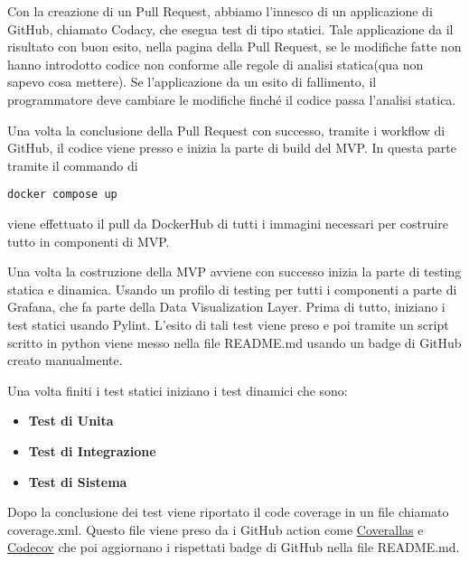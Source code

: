 Con la creazione di un Pull Request, abbiamo l'innesco di un applicazione di GitHub, chiamato Codacy, che esegua test di tipo statici. Tale applicazione da il risultato con buon esito, nella pagina della Pull Request, se le modifiche fatte non hanno introdotto codice non conforme alle regole di analisi statica(qua non sapevo cosa mettere). Se l'applicazione da un esito di fallimento, il programmatore deve cambiare le modifiche finché il codice passa l'analisi statica.

\vspace{0.2cm}

Una volta la conclusione della Pull Request con successo, tramite i workflow di GitHub, il codice viene presso e inizia la parte di build del MVP. In questa parte tramite il commando di
\begin{lstlisting}[style=code]
    docker compose up
\end{lstlisting}
viene effettuato il pull da DockerHub di tutti i immagini necessari per costruire tutto in componenti di MVP.

\vspace{0.2cm}

Una volta la costruzione della MVP avviene con successo inizia la parte di testing statica e dinamica. Usando un profilo di testing per tutti i componenti a parte di Grafana, che fa parte della Data Visualization Layer. Prima di tutto, iniziano i test statici usando Pylint. L'esito di tali test viene preso e poi tramite un script scritto in python viene messo nella file README.md usando un badge di GitHub creato manualmente.

\vspace{0.2cm}

Una volta finiti i test statici iniziano i test dinamici che sono:

\begin{itemize}
    \item \textbf{Test di Unita}
    \item \textbf{Test di Integrazione}
    \item \textbf{Test di Sistema}
\end{itemize}

Dopo la conclusione dei test viene riportato il code coverage in un file chiamato coverage.xml. Questo file viene preso da i GitHub action come \href{https://github.com/marketplace/actions/coveralls-github-action}{Coverallas} e \href{https://github.com/marketplace/actions/codecov}{Codecov}
che poi aggiornano i rispettati badge di GitHub nella file README.md.


